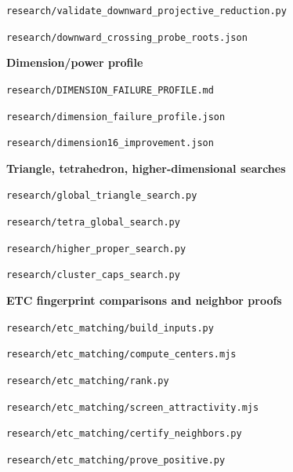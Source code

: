 \documentclass[11pt]{article}
\theoremstyle{definition}
\newcommand{\pathcode}[1]{\nolinkurl{#1}}
\begin{document}
\pathcode{research/validate_downward_projective_reduction.py}\par
\pathcode{research/downward_crossing_probe_roots.json}\par\medskip
\noindent\textbf{Dimension/power profile}\par\nopagebreak[4]
\pathcode{research/DIMENSION_FAILURE_PROFILE.md}\par
\pathcode{research/dimension_failure_profile.json}\par
\pathcode{research/dimension16_improvement.json}\par\medskip
\noindent\textbf{Triangle, tetrahedron, higher-dimensional searches}\par\nopagebreak[4]
\pathcode{research/global_triangle_search.py}\par
\pathcode{research/tetra_global_search.py}\par
\pathcode{research/higher_proper_search.py}\par
\pathcode{research/cluster_caps_search.py}\par\medskip
\noindent\textbf{ETC fingerprint comparisons and neighbor proofs}\par\nopagebreak[4]
\pathcode{research/etc_matching/build_inputs.py}\par
\pathcode{research/etc_matching/compute_centers.mjs}\par
\pathcode{research/etc_matching/rank.py}\par
\pathcode{research/etc_matching/screen_attractivity.mjs}\par
\pathcode{research/etc_matching/certify_neighbors.py}\par
\pathcode{research/etc_matching/prove_positive.py}\par\medskip
\endgroup
\end{document}
